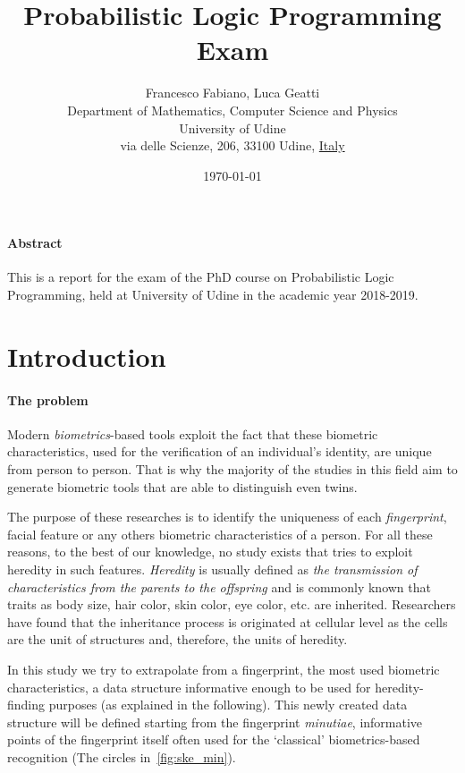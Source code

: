 \documentclass[8pt]{article}
\title{Probabilistic Logic Programming Exam}
\author{
        Francesco Fabiano, Luca Geatti\\
        \footnotesize Department of Mathematics, Computer Science and Physics \\
        \footnotesize University of Udine\\
        \footnotesize via delle Scienze, 206, 33100 Udine, \underline{Italy}
}
\date{\footnotesize\today}
\begin{document}
\maketitle
\paragraph{Abstract}
This is a report for the exam of the PhD course on Probabilistic Logic
Programming, held at University of Udine in the academic year 2018-2019.



\section{Introduction}

  \paragraph{The problem}
    Modern \textit{biometrics}-based tools exploit the fact that these biometric characteristics, used for the verification of an individual’s identity, are unique from person to person.
    That is why the majority of the studies in this field aim to generate biometric tools that are able to distinguish even twins.
    
    The purpose of these researches is to identify the uniqueness of each \textit{fingerprint}, facial feature or any others biometric characteristics of a person.
    For all these reasons, to the best of our knowledge, no study exists that tries to exploit heredity in such features.
    \textit{Heredity} is usually defined as \textit{the transmission of characteristics from the parents to the offspring}
    and is commonly known that traits as body size, hair color, skin color, eye color, etc. are inherited.
    Researchers have found that the inheritance process is originated at cellular level as the cells are the unit of structures and, therefore, the units of heredity.
    
    In this study we try to extrapolate from a fingerprint, the most used biometric characteristics, a data structure informative enough to be used for heredity-finding purposes (as explained in the following).
    This newly created data structure will be defined starting from the fingerprint \textit{minutiae}, informative points of the fingerprint itself often used for the \textquoteleft classical' biometrics-based recognition (The circles in~\cref{fig:ske_min}).
\end{document}

